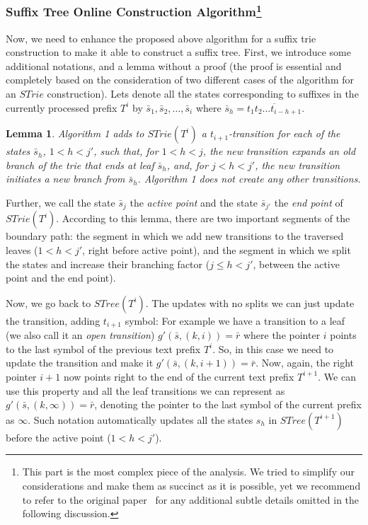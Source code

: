 \documentclass[paper=a4, fontsize=11pt]{scrartcl} %
\numberwithin{equation}{section} %
\numberwithin{figure}{section} %
\numberwithin{table}{section} %
\newtheorem{lemma}[theorem]{Lemma}
\begin{document}
\subsubsection[Suffix Tree Online Construction Algorithm]{Suffix Tree Online Construction Algorithm\footnote{This part is the most complex piece of the analysis. We tried to simplify our considerations and make them as succinct as it is possible, yet we recommend to refer to the original paper~\cite{ukkonen1995line} for any additional subtle details omitted in the following discussion.}}
Now, we need to enhance the proposed above algorithm for a suffix trie construction to make it able to construct a suffix tree. First, we introduce some additional notations, and a lemma without a proof (the proof is essential and completely based on the consideration of two different cases of the algorithm for an $STrie$ construction). Lets denote all the states corresponding to suffixes in the currently processed prefix $T^i$ by $\bar s_1, \bar s_2, \dots, \bar s_i$ where $\bar s_h = \overline{t_1 t_2 \dots t_{i - h + 1}}$.

\begin{lemma}
\label{lemma:active-end-point}
Algorithm 1 adds to $STrie( T^i)$ a $t_{i+1}$-transition for each of the states $\bar{s}_h$,
$1 < h < j'$, such that, for $1 < h < j$, the new transition expands an old branch of
the trie that ends at leaf $\bar{s}_h$, and, for $j < h < j'$, the new transition initiates a new branch from $\bar{s}_h$. Algorithm 1 does not create any other transitions.
\end{lemma}

Further, we call the state $\bar{s}_j$ the \textit{active point} and the state $\bar{s}_{j'}$ the \textit{end point} of $STrie(T^i)$. According to this lemma, there are two important segments of the boundary path: the segment in which we add new transitions to the traversed leaves ($1 < h < j'$, right before active point), and the segment in which we split the states and increase their branching factor ($j \le h < j'$, between the active point and the end point).

\par Now, we go back to $STree(T^i)$. The updates with no splits we can just update the transition, adding $t_{i+1}$ symbol: For example we have a transition to a leaf (we also call it an \textit{open transition}) $g'(\bar{s}, (k, i)) = \bar{r}$ where the pointer $i$ points to the last symbol of the previous text prefix $T^i$. So, in this case we need to update the transition and make it $g'(\bar{s}, (k, i+1)) = \bar{r}$. Now, again, the right pointer $i+1$ now points right to the end of the current text prefix $T^{i+1}$. We can use this property and all the leaf transitions we can represent as $g'(\bar{s}, (k, \infty)) = \bar{r}$, denoting the pointer to the last symbol of the current prefix as $\infty$. Such notation automatically updates all the states $s_h$ in $STree(T^{i+1})$ before the active point ($1 < h < j'$).
\end{document}
